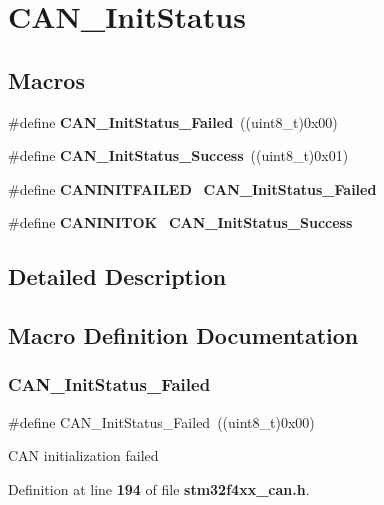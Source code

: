 \section{C\+A\+N\+\_\+\+Init\+Status}
\label{group__CAN__InitStatus}
\subsection*{Macros}
\begin{DoxyCompactItemize}
\item 
\#define \textbf{ C\+A\+N\+\_\+\+Init\+Status\+\_\+\+Failed}~((uint8\+\_\+t)0x00)
\item 
\#define \textbf{ C\+A\+N\+\_\+\+Init\+Status\+\_\+\+Success}~((uint8\+\_\+t)0x01)
\item 
\#define \textbf{ C\+A\+N\+I\+N\+I\+T\+F\+A\+I\+L\+ED}~\textbf{ C\+A\+N\+\_\+\+Init\+Status\+\_\+\+Failed}
\item 
\#define \textbf{ C\+A\+N\+I\+N\+I\+T\+OK}~\textbf{ C\+A\+N\+\_\+\+Init\+Status\+\_\+\+Success}
\end{DoxyCompactItemize}


\subsection{Detailed Description}


\subsection{Macro Definition Documentation}
\mbox{\label{group__CAN__InitStatus_ga095c319e8c54c974eb2b6eeadf180d96}} 
\subsubsection{C\+A\+N\+\_\+\+Init\+Status\+\_\+\+Failed}
{\footnotesize\ttfamily \#define C\+A\+N\+\_\+\+Init\+Status\+\_\+\+Failed~((uint8\+\_\+t)0x00)}

C\+AN initialization failed 

Definition at line \textbf{ 194} of file \textbf{ stm32f4xx\+\_\+can.\+h}.

\mbox{\label{group__CAN__InitStatus_ga6bed5957af8f2f6b00568e15ccac5772}} 

